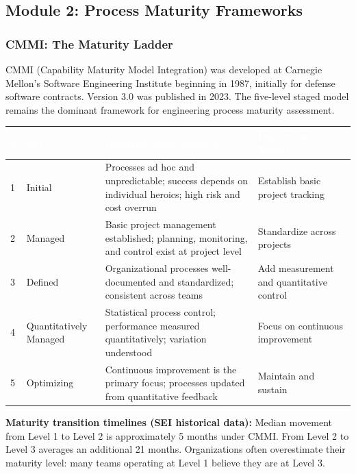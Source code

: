 \documentclass[11pt,letterpaper]{article}
\newcommand{\tableheader}[1]{\textbf{\sffamily\textcolor{white}{#1}}}
\begin{document}
\subsection{Module 2: Process Maturity Frameworks}

\subsubsection{CMMI: The Maturity Ladder}

CMMI (Capability Maturity Model Integration) was developed at Carnegie Mellon's Software Engineering Institute beginning in 1987, initially for defense software contracts. Version 3.0 was published in 2023. The five-level staged model remains the dominant framework for engineering process maturity assessment.

\begin{center}
\begin{tabularx}{\textwidth}{L{1cm}L{2.5cm}XL{3.5cm}}
\toprule
{}
\tableheader{L} & \tableheader{Level} & \tableheader{Organizational Signature} & \tableheader{Improvement Target} \\
 & Initial & Processes ad hoc and unpredictable; success depends on individual heroics; high risk and cost overrun & Establish basic project tracking \\
2 & Managed & Basic project management established; planning, monitoring, and control exist at project level & Standardize across projects \\
3 & Defined & Organizational processes well-documented and standardized; consistent across teams & Add measurement and quantitative control \\
4 & Quantitatively Managed & Statistical process control; performance measured quantitatively; variation understood & Focus on continuous improvement \\
5 & Optimizing & Continuous improvement is the primary focus; processes updated from quantitative feedback & Maintain and sustain \\
\bottomrule
\end{tabularx}
\end{center}

\textbf{Maturity transition timelines (SEI historical data):} Median movement from Level 1 to Level 2 is approximately 5 months under CMMI. From Level 2 to Level 3 averages an additional 21 months. Organizations often overestimate their maturity level: many teams operating at Level 1 believe they are at Level 3.
\end{document}
